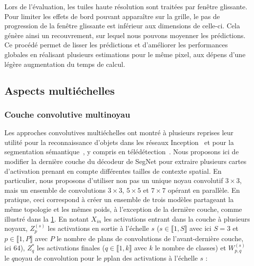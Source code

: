 Lors de l'évaluation, les tuiles haute résolution sont traitées par fenêtre glissante. Pour limiter les effets de bord pouvant apparaître sur la grille, le pas de progression de la fenêtre glissante est inférieur aux dimensions de celle-ci. Cela génère ainsi un recouvrement, sur lequel nous pouvons moyenner les prédictions. Ce procédé permet de lisser les prédictions et d'améliorer les performances globales en réalisant plusieurs estimations pour le même pixel, aux dépens d'une légère augmentation du temps de calcul.

\subsection{Aspects multiéchelles}

\subsubsection{Couche convolutive multinoyau}

\begin{figure}[ht]
  \resizebox{\textwidth}{!}{}
  \label{fig:contextual_module}
\end{figure}

Les approches convolutives multiéchelles ont montré à plusieurs reprises leur utilité pour la reconnaissance d'objets dans les réseaux Inception~\cite{szegedy_going_2015} et pour la segmentation sémantique~\cite{yu_multi-scale_2015}, y compris en télédétection~\cite{zhao_learning_2016}. Nous proposons ici de modifier la dernière couche du décodeur de SegNet pour extraire plusieurs cartes d'activation prenant en compte différentes tailles de contexte spatial. En particulier, nous proposons d'utiliser non pas un unique noyau convolutif $3\times3$, mais un ensemble de convolutions $3\times3$, $5\times5$ et $7\times7$ opérant en parallèle. En pratique, ceci correspond à créer un ensemble de trois modèles partageant la même topologie et les mêmes poids, à l'exception de la dernière couche, comme illustré dans la \cref{fig:contextual_module}. En notant $X_\mathit{in}$ les activations entrant dans la couche à plusieurs noyaux, $Z_p^{(s)}$ les activations en sortie à l'échelle $s$ ($s \in \llbracket 1, S\rrbracket$ avec ici $S = 3$ et $p \in \llbracket 1, P \rrbracket$ avec $P$ le nombre de plans de convolutions de l'avant-dernière couche, ici 64), $Z^*_q$ les activations finales ($q \in \llbracket 1, k \rrbracket$ avec $k$ le nombre de classes) et $W_{p,q}^{(s)}$ le $q$\ieme noyau de convolution pour le $p$\ieme plan des activations à l'échelle $s$ :

